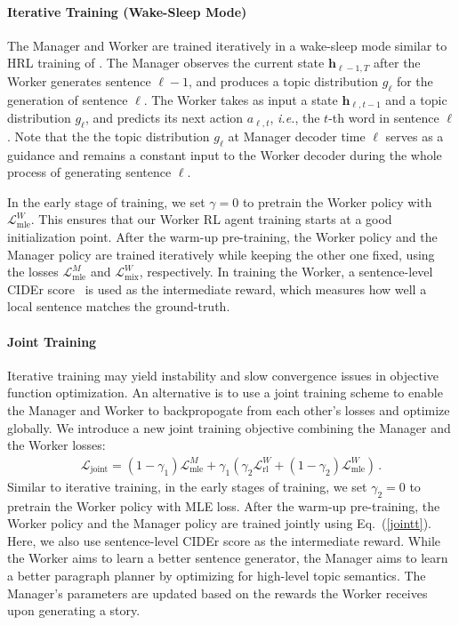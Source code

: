 \documentclass[letterpaper]{article} \usepackage{aaai19}  \usepackage{times}  \usepackage{helvet}  \usepackage{courier}  \usepackage{url}  \usepackage{graphicx}
\newcommand{\hv}{{\boldsymbol h}}
\newcommand{\Lcal}{\mathcal{L}}
\begin{document}
\paragraph{Iterative Training (Wake-Sleep Mode)}
The Manager and Worker are trained iteratively in a wake-sleep mode similar to HRL training of \cite{wang2018video}.
The Manager observes the current state $\hv_{\ell-1,T}$ after the Worker generates sentence $\ell-1$, and produces a topic distribution $g_{\ell}$ for the generation of sentence $\ell$. The Worker takes as input a state $\hv_{\ell,t-1}$ and a topic distribution $g_{\ell}$, and predicts its next action $a_{\ell,t}$, \emph{i.e.}, the $t$-th word in sentence $\ell$. Note that the the topic distribution $g_{\ell}$ at Manager decoder time $\ell$ serves as a guidance and remains a constant input to the Worker decoder during the whole process of generating sentence $\ell$. 

In the early stage of training, we set $\gamma=0$ to pretrain the Worker policy with $\Lcal_{\textrm{mle}}^W$. This ensures that our Worker RL agent training starts at a good initialization point. 
After the warm-up pre-training, the Worker policy and the Manager policy are trained iteratively while keeping the other one fixed, using the losses $\Lcal_{\textrm{mle}}^M$ and $\Lcal_{\textrm{mix}}^W$, respectively. In training the Worker, a sentence-level CIDEr score~\cite{vedantam2015cider} is used as the intermediate reward, which measures how well a local sentence matches the ground-truth. 

\paragraph{Joint Training}
Iterative training may yield instability and slow convergence issues in objective function optimization. An alternative is to use a joint training scheme to enable the Manager and Worker to backpropogate from each other's losses and optimize globally. We introduce a new joint training objective combining the Manager and the Worker losses:
\begin{align}
	\Lcal_{\textrm{joint}} = (1-\gamma_1) \Lcal_{\textrm{mle}}^M + \gamma_1(\gamma_2 \Lcal_{\textrm{rl}}^W  +(1-\gamma_2) \Lcal_{\textrm{mle}}^W)\,.
	\label{jointt}
\end{align}
Similar to iterative training, in the early stages of training, we set $\gamma_2=0$ to pretrain the Worker policy with MLE loss. 
After the warm-up pre-training, the Worker policy and the Manager policy are trained jointly using Eq.~(\ref{jointt}). Here, we also use sentence-level CIDEr score as the intermediate reward. While the Worker aims to learn a better sentence generator, the Manager aims to learn a better paragraph planner by optimizing for high-level topic semantics. The Manager's parameters are updated based on the rewards the Worker receives upon generating a story.  
\end{document}
